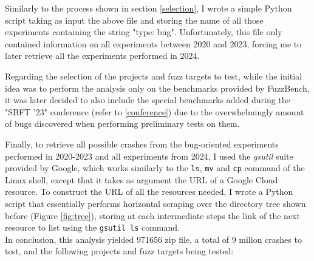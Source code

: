 Similarly to the process shown in section \ref{selection}, I wrote a simple Python script taking as input the above file and storing the name of all those experiments containing the string "type: bug". Unfortunately, this file only contained information on all experiments between 2020 and 2023, forcing me to later retrieve all the experiments performed in 2024.

Regarding the selection of the projects and fuzz targets to test, while the initial idea was to perform the analysis only on the benchmarks provided by FuzzBench, it was later decided to also include the special benchmarks added during the "SBFT '23" conference (refer to \ref{conference}) due to the overwhelmingly amount of bugs discovered when performing preliminary tests on them.

Finally, to retrieve all possible crashes from the bug-oriented experiments performed in 2020-2023 and all experiments from 2024, I used the \textit{gsutil} suite provided by Google, which works similarly to the \verb|ls|, \verb|mv| and \verb|cp| command of the Linux shell, except that it takes as argument the URL of a Google Cloud resource. To construct the URL of all the resources needed, I wrote a Python script that essentially performs horizontal scraping over the directory tree shown before (Figure \ref{fig:tree}), storing at each intermediate steps the link of the next resource to list using the \verb|gsutil ls| command.
\ \\ 

In conclusion, this analysis yielded 971656 zip file, a total of 9 milion crashes to test, and the following projects and fuzz targets being tested:

